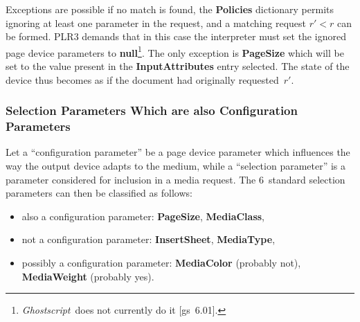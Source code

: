 \documentclass[twoside,a4paper]{article}
\newcommand{\Gs}{\textit{Ghostscript\/}}
\newcommand{\ps}[1]{{\sffamily\bfseries #1}}	%
\begin{document}
Exceptions are possible if no match is found,
the \ps{Policies} dictionary permits ignoring at least one parameter in the
request,
and a matching request $r' < r$ can be formed.
PLR3 demands that in this case the interpreter must set the ignored
page device parameters to \ps{null}\footnote{%
  \Gs\ does not currently do it [gs~6.01].}.
The only exception is \ps{PageSize} which will be set to the value present
in the \ps{InputAttributes} entry selected.
The state of the device thus becomes as if the document had originally
requested~$r'$.


\subsubsection{Selection Parameters Which are also Configuration Parameters}

Let a ``configuration parameter'' be a page device parameter which influences
the way the output device adapts to the medium,
while a ``selection parameter'' is a parameter considered for inclusion in a
media request.
The 6~standard selection parameters can then be classified as follows:
\begin{itemize}
  \item
    also a configuration parameter:
      \ps{PageSize},
      \ps{MediaClass},
  \item
    not a configuration parameter:
      \ps{InsertSheet},
      \ps{MediaType},
  \item
    possibly a configuration parameter:
      \ps{MediaColor} (probably not),
      \ps{MediaWeight} (probably yes).
\end{itemize}
\end{document}
